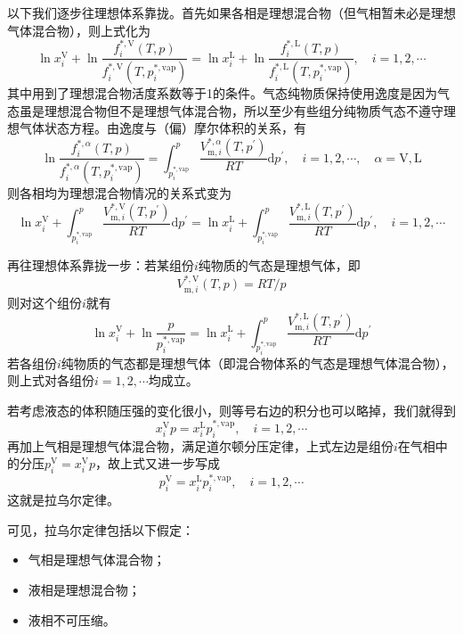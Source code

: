 \documentclass[main.tex]{subfiles}
\begin{document}
以下我们逐步往理想体系靠拢。首先如果各相是理想混合物（但气相暂未必是理想气体混合物），则上式化为
\[\ln x_i^\text{V}+\ln\frac{f_i^{*,\text{V}}\left(T,p\right)}{f_i^{*,\text{V}}\left(T,p_i^{*,\text{vap}}\right)}=\ln x_i^\text{L}+\ln\frac{f_i^{*,\text{L}}\left(T,p\right)}{f_i^{*,\text{L}}\left(T,p_i^{*,\text{vap}}\right)},\quad i=1,2,\cdots\]
其中用到了理想混合物活度系数等于1的条件。气态纯物质保持使用逸度是因为气态虽是理想混合物但不是理想气体混合物，所以至少有些组分纯物质气态不遵守理想气体状态方程。由逸度与（偏）摩尔体积的关系，有
\[\ln\frac{f_i^{*,\alpha}\left(T,p\right)}{f_i^{*,\alpha}\left(T,p_i^{*,\text{vap}}\right)}=\int_{p_i^{*,\text{vap}}}^p\frac{V_{\text{m},i}^{*,\alpha}\left(T,p^\prime\right)}{RT}\mathrm{d}p^\prime,\quad i=1,2,\cdots,\quad \alpha=\text{V},\text{L}\]
则各相均为理想混合物情况的关系式变为
\[\ln x_i^\text{V}+\int_{p_i^{*,\text{vap}}}^{p}\frac{V_{\text{m},i}^{*,\text{V}}\left(T,p^\prime\right)}{RT}\mathrm{d}p^\prime=\ln x_i^\text{L}+\int_{p_i^{*,\text{vap}}}^{p}\frac{V_{\text{m},i}^{*,\text{L}}\left(T,p^\prime\right)}{RT}\mathrm{d}p^\prime,\quad i=1,2,\cdots\]

再往理想体系靠拢一步：若某组份$i$纯物质的气态是理想气体，即
\[V_{\text{m},i}^{*,\text{V}}\left(T,p\right)=RT/p\]
则对这个组份$i$就有
\[\ln x_i^\text{V}+\ln\frac{p}{p_i^{*,\text{vap}}}=\ln x_i^\text{L}+\int_{p_i^{*,\text{vap}}}^{p}\frac{V_{\text{m},i}^{*,\text{L}}\left(T,p^\prime\right)}{RT}\mathrm{d}p^\prime \]
若各组份$i$纯物质的气态都是理想气体（即混合物体系的气态是理想气体混合物），则上式对各组份$i=1,2,\cdots$均成立。

若考虑液态的体积随压强的变化很小，则等号右边的积分也可以略掉，我们就得到
\[x_i^\text{V}p=x_i^\text{L}p_i^{*,\text{vap}},\quad i=1,2,\cdots\]
再加上气相是理想气体混合物，满足道尔顿分压定律，上式左边是组份$i$在气相中的分压$p^\text{V}_i=x_i^\text{V}p$，故上式又进一步写成
\[p_i^\text{V}=x_i^\text{L}p_i^{*,\text{vap}},\quad i=1,2,\cdots\]
这就是拉乌尔定律。

可见，拉乌尔定律包括以下假定：
\begin{itemize}
  \item 气相是理想气体混合物；
  \item 液相是理想混合物；
  \item 液相不可压缩。
\end{itemize}
\end{document}
